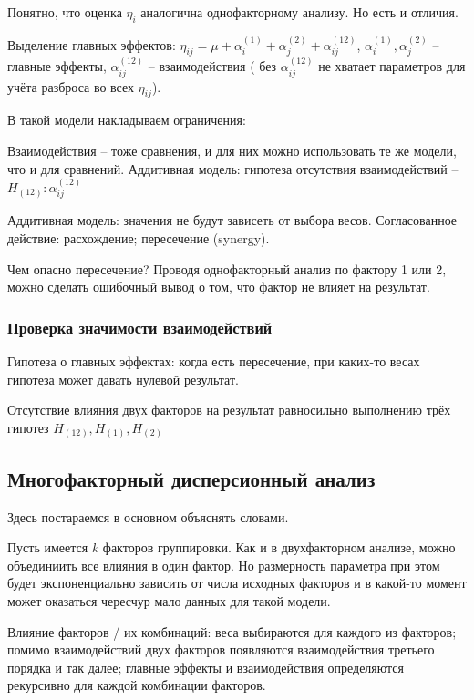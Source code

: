\documentclass[main.tex]{subfiles}
\begin{document}
Понятно, что оценка $ \eta_i $ аналогична однофакторному анализу.
Но есть и отличия.

Выделение главных эффектов: $ \eta_{ij} = \mu + \alpha_i^{(1)} + \alpha_j^{(2)} + \alpha_{ij}^{(12)} $, $\alpha_i^{(1)}, \alpha_j^{(2)}$ -- главные эффекты, $ \alpha_{ij}^{(12)} $ -- взаимодействия ( без $ \alpha_{ij}^{(12)}$ не хватает параметров для учёта разброса во всех $ \eta_{ij} $).

В такой модели накладываем ограничения: %

Взаимодействия -- тоже сравнения, и для них можно использовать те же модели, что и для сравнений.
Аддитивная модель: гипотеза отсутствия взаимодействий -- $ H_{(12)} : \alpha_{ij}^{(12)} $


Аддитивная модель: значения не будут зависеть от выбора весов.
Согласованное действие: расхождение; пересечение (synergy).

Чем опасно пересечение?
Проводя однофакторный анализ по фактору 1 или 2, можно сделать ошибочный вывод о том, что фактор не влияет на результат.

\subsubsection{Проверка значимости взаимодействий}


Гипотеза о главных эффектах: когда есть пересечение, при каких-то весах гипотеза может давать нулевой результат.

Отсутствие влияния двух факторов на результат равносильно выполнению трёх гипотез $ H_{(12)}, H_{(1)}, H_{(2)} $

\subsection{Многофакторный дисперсионный анализ}

Здесь постараемся в основном объяснять словами.

Пусть имеется $ k $ факторов группировки.
Как и в двухфакторном анализе, можно объединиить все влияния в один фактор.
Но размерность параметра при этом будет экспоненциально зависить от числа исходных факторов и в какой-то момент может оказаться чересчур мало данных для такой модели.

Влияние факторов / их комбинаций:
веса выбираются для каждого из факторов; помимо взаимодействий двух факторов появляются взаимодействия третьего порядка и так далее;  главные эффекты и взаимодействия определяются рекурсивно для каждой комбинации факторов.
\end{document}
